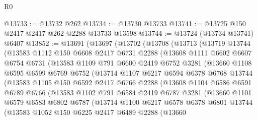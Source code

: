 \begin{lexlean}{R0}
\begin{coremodule}
@13733 := @13732 @262
@13734 := @13730 @13733
@13741 := @13725 @150 @2417 @2417 @262 @2288 @13733 @13598
@13744 := @13724 (@13734 @13741) @6407
@13852 := @13691
    (@13697
      (@13702
        (@13708
          (@13713
            (@13719
              @13744
              (@13583
                @1112
                @150
                @6608
                @2417
                @6731
                @2288
                (@13608
                  @1111
                  @6602
                  @6607
                  @6754
                  @6731
                  (@13583
                    @1109
                    @791
                    @6600
                    @2419
                    @6752
                    @3281
                    (@13660
                      @1108
                      @6595
                      @6599
                      @6769
                      @6752
                      (@13714
                        @1107
                        @6217
                        @6594
                        @6378
                        @6768
                        @13744
                        (@13583
                          @1105
                          @150
                          @6592
                          @2417
                          @6766
                          @2288
                          (@13608
                            @1104
                            @6586
                            @6591
                            @6789
                            @6766
                            (@13583
                              @1102
                              @791
                              @6584
                              @2419
                              @6787
                              @3281
                              (@13660
                                @1101
                                @6579
                                @6583
                                @6802
                                @6787
                                (@13714
                                  @1100
                                  @6217
                                  @6578
                                  @6378
                                  @6801
                                  @13744
                                  (@13583
                                    @1052
                                    @150
                                    @6225
                                    @2417
                                    @6489
                                    @2288
                                    (@13660

\end{coremodule}
\end{lexlean}
